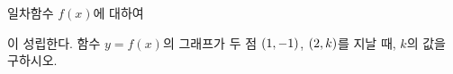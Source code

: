 일차함수 $f(x)$에 대하여 \par\smallskip{}\par\smallskip\noindent 이 성립한다. 함수 $y=f(x)$의 그래프가 두 점 $(1{,}\mkern3mu\mathopen{}-1)$, $(2{,}\mkern3mu\mathopen{}k)$를 지날 때, $k$의 값을 구하시오.
